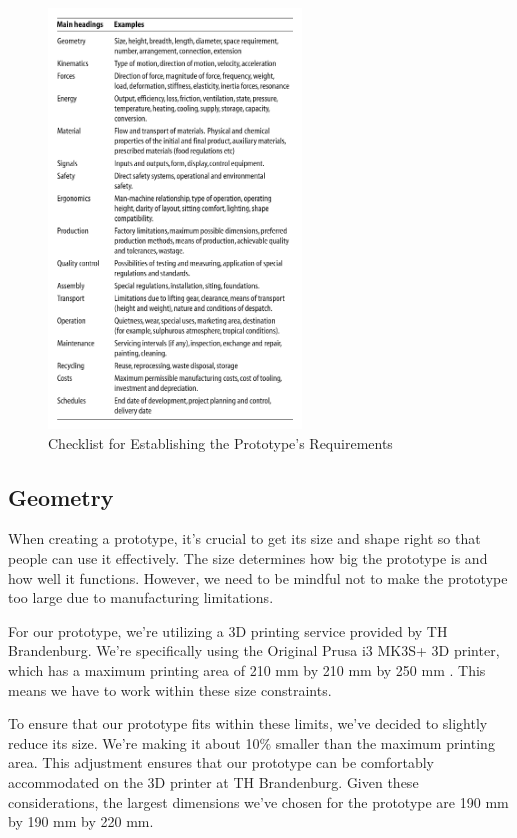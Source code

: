 \begin{figure}[ht!]
    \centering
    \includegraphics[width=0.6\textwidth]{texs/Part1/chapter2/image/requirements.png}
    \caption{Checklist for Establishing the Prototype's Requirements \cite{Pahl07o}}
    \label{fig:checklist}
\end{figure}

\subsection{Geometry}
When creating a prototype, it's crucial to get its size and shape right so that people can use it effectively. The size determines how big the prototype is and how well it functions. However, we need to be mindful not to make the prototype too large due to manufacturing limitations.

For our prototype, we're utilizing a 3D printing service provided by TH Brandenburg. We're specifically using the Original Prusa i3 MK3S+ 3D printer, which has a maximum printing area of 210 mm by 210 mm by 250 mm \cite{Prusa}. This means we have to work within these size constraints.

To ensure that our prototype fits within these limits, we've decided to slightly reduce its size. We're making it about 10\% smaller than the maximum printing area. This adjustment ensures that our prototype can be comfortably accommodated on the 3D printer at TH Brandenburg. Given these considerations, the largest dimensions we've chosen for the prototype are 190 mm by 190 mm by 220 mm.

